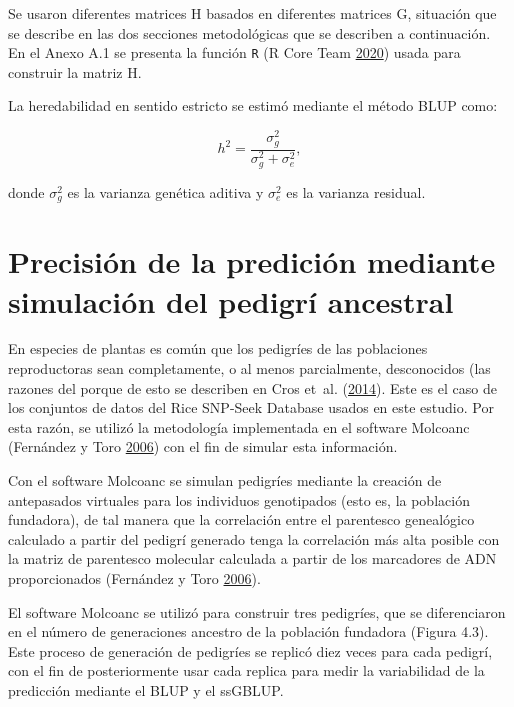 \documentclass[11pt,spanish,a4paper,oneside,]{book} %
\begin{document}
Se usaron diferentes matrices H basados en diferentes matrices G, situación que se describe en las dos secciones metodológicas que se describen a continuación. En el Anexo A.1 se presenta la función \texttt{R} (R Core Team \protect\hyperlink{ref-cite:52}{2020}) usada para construir la matriz H.

La heredabilidad en sentido estricto se estimó mediante el método BLUP como:

\begin{equation}
h^{2} = \frac{\sigma^{2}_{g}}{\sigma^{2}_{g} + \sigma^{2}_{e}},
\end{equation}

donde \(\sigma^{2}_{g}\) es la varianza genética aditiva y \(\sigma^{2}_{e}\) es la varianza residual.

\hypertarget{precisiuxf3n-de-la-prediciuxf3n-mediante-simulaciuxf3n-del-pedigruxed-ancestral}{%
\section{Precisión de la predición mediante simulación del pedigrí ancestral}\label{precisiuxf3n-de-la-prediciuxf3n-mediante-simulaciuxf3n-del-pedigruxed-ancestral}}

En especies de plantas es común que los pedigríes de las poblaciones reproductoras sean completamente, o al menos parcialmente, desconocidos (las razones del porque de esto se describen en Cros et~al. (\protect\hyperlink{ref-cite:48}{2014}). Este es el caso de los conjuntos de datos del Rice SNP-Seek Database usados en este estudio. Por esta razón, se utilizó la metodología implementada en el software Molcoanc (Fernández y Toro \protect\hyperlink{ref-cite:24}{2006}) con el fin de simular esta información.

Con el software Molcoanc se simulan pedigríes mediante la creación de antepasados virtuales para los individuos genotipados (esto es, la población fundadora), de tal manera que la correlación entre el parentesco genealógico calculado a partir del pedigrí generado tenga la correlación más alta posible con la matriz de parentesco molecular calculada a partir de los marcadores de ADN proporcionados (Fernández y Toro \protect\hyperlink{ref-cite:24}{2006}).

El software Molcoanc se utilizó para construir tres pedigríes, que se diferenciaron en el número de generaciones ancestro de la población fundadora (Figura 4.3). Este proceso de generación de pedigríes se replicó diez veces para cada pedigrí, con el fin de posteriormente usar cada replica para medir la variabilidad de la predicción mediante el BLUP y el ssGBLUP.
\end{document}
